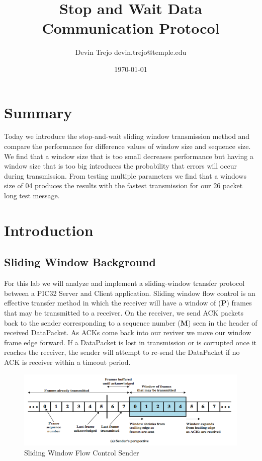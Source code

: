 \documentclass[12pt]{article}
\begin{document}
\title{Stop and Wait Data Communication Protocol}
\author{Devin Trejo \tabularnewline devin.trejo@temple.edu}
\date{\today}
\maketitle

\section{Summary}
\label{sect:summary}
Today we introduce the stop-and-wait sliding window transmission method 
and compare the performance for difference values of window size and 
sequence size. We find that a window size that is too small decreases
performance but having a window size that is too big introduces the
probability that errors will occur during transmission. From testing
multiple parameters we find that a windows size of 04 produces the results
with the fastest transmission for our 26 packet long test message. 

\section{Introduction}
\label{sect:intro}
\subsection{Sliding Window Background}
\label{sect:background}

For this lab we will analyze and implement a sliding-window transfer
protocol between a PIC32 Server and Client application. Sliding window
flow control is an effective transfer method in which the receiver will
have a window of (\textbf{P}) frames that may be transmitted to a receiver. On
the receiver, we send ACK packets back to the sender corresponding to a 
sequence number (\textbf{M}) seen in the header of received DataPacket.  As 
ACKs come back into our reviver we move our window frame edge forward. If a 
DataPacket is lost in transmission or is corrupted once it reaches the 
receiver, the sender will attempt to re-send the DataPacket if no ACK is 
receiver within a timeout period. 

\begin{figure}[H]
    \centering
    \includegraphics[width=4.5in]{slide_tx_diagram.png}
    \caption{Sliding Window Flow Control Sender}
    \label{fig:slidetx}
\end{figure}
\end{document}

